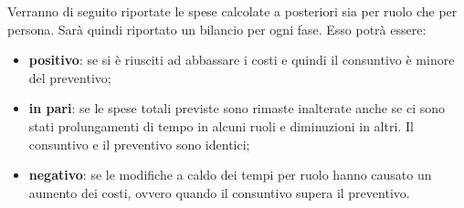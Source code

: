 	Verranno di seguito riportate le spese calcolate a posteriori sia per ruolo che per persona.
	Sarà quindi riportato un bilancio per ogni fase. Esso potrà essere:
	\begin{itemize}
		\item \textbf{positivo}: se si è riusciti ad abbassare i costi e quindi il consuntivo è minore del preventivo;
		\item \textbf{in pari}: se le spese totali previste sono rimaste inalterate anche se ci sono stati prolungamenti di tempo in alcuni ruoli e diminuzioni in altri. Il consuntivo e il preventivo sono identici;
		\item \textbf{negativo}: se le modifiche a caldo dei tempi per ruolo hanno causato un aumento dei costi, ovvero quando il consuntivo supera il preventivo.
	\end{itemize}
	
						
						

